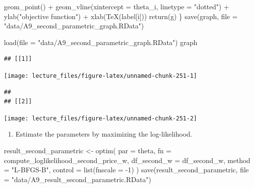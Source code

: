 \documentclass[
]{book}
\newenvironment{Shaded}{\begin{snugshade}}{\end{snugshade}}
\newcommand{\AttributeTok}[1]{\textcolor[rgb]{0.77,0.63,0.00}{#1}}
\newcommand{\DecValTok}[1]{\textcolor[rgb]{0.00,0.00,0.81}{#1}}
\newcommand{\FunctionTok}[1]{\textcolor[rgb]{0.00,0.00,0.00}{#1}}
\newcommand{\NormalTok}[1]{#1}
\newcommand{\OtherTok}[1]{\textcolor[rgb]{0.56,0.35,0.01}{#1}}
\newcommand{\SpecialCharTok}[1]{\textcolor[rgb]{0.00,0.00,0.00}{#1}}
\newcommand{\StringTok}[1]{\textcolor[rgb]{0.31,0.60,0.02}{#1}}
\providecommand{\tightlist}{%
  \setlength{\itemsep}{0pt}\setlength{\parskip}{0pt}}
\begin{document}
\begin{Shaded}
\begin{Highlighting}[]
    \FunctionTok{geom\_point}\NormalTok{() }\SpecialCharTok{+}
    \FunctionTok{geom\_vline}\NormalTok{(}\AttributeTok{xintercept =}\NormalTok{ theta\_i, }\AttributeTok{linetype =} \StringTok{"dotted"}\NormalTok{) }\SpecialCharTok{+}
    \FunctionTok{ylab}\NormalTok{(}\StringTok{"objective function"}\NormalTok{) }\SpecialCharTok{+} \FunctionTok{xlab}\NormalTok{(}\FunctionTok{TeX}\NormalTok{(label[i]))}
  \FunctionTok{return}\NormalTok{(g)}
\NormalTok{\}}
\FunctionTok{save}\NormalTok{(graph, }\AttributeTok{file =} \StringTok{"data/A9\_second\_parametric\_graph.RData"}\NormalTok{)}
\end{Highlighting}
\end{Shaded}

\begin{Shaded}
\begin{Highlighting}[]
\FunctionTok{load}\NormalTok{(}\AttributeTok{file =} \StringTok{"data/A9\_second\_parametric\_graph.RData"}\NormalTok{)}
\NormalTok{graph}
\end{Highlighting}
\end{Shaded}

\begin{verbatim}
## [[1]]
\end{verbatim}

\begin{center}\texttt{[image: lecture\_files/figure-latex/unnamed-chunk-251-1]} \end{center}

\begin{verbatim}
## 
## [[2]]
\end{verbatim}

\begin{center}\texttt{[image: lecture\_files/figure-latex/unnamed-chunk-251-2]} \end{center}

\begin{enumerate}
\def\labelenumi{\arabic{enumi}.}
\setcounter{enumi}{3}
\tightlist
\item
  Estimate the parameters by maximizing the log-likelihood.
\end{enumerate}

\begin{Shaded}
\begin{Highlighting}[]
\NormalTok{result\_second\_parametric }\OtherTok{\textless{}{-}}
  \FunctionTok{optim}\NormalTok{(}
    \AttributeTok{par =}\NormalTok{ theta,}
    \AttributeTok{fn =}\NormalTok{ compute\_loglikelihood\_second\_price\_w,}
    \AttributeTok{df\_second\_w =}\NormalTok{ df\_second\_w,}
    \AttributeTok{method =} \StringTok{"L{-}BFGS{-}B"}\NormalTok{,}
    \AttributeTok{control =} \FunctionTok{list}\NormalTok{(}\AttributeTok{fnscale =} \SpecialCharTok{{-}}\DecValTok{1}\NormalTok{)}
\NormalTok{  )}
\FunctionTok{save}\NormalTok{(result\_second\_parametric, }\AttributeTok{file =} \StringTok{"data/A9\_result\_second\_parametric.RData"}\NormalTok{)}
\end{Highlighting}
\end{Shaded}
\end{document}
